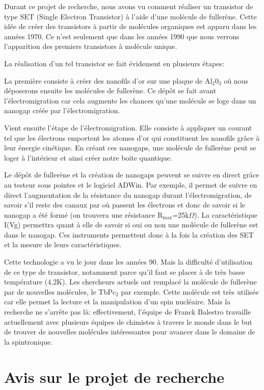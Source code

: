 Durant ce projet de recherche, nous avons vu comment réaliser un transistor de type SET (Single Electron Transistor) à l'aide d'une molécule de fullerène. Cette idée de créer des transistors à partir de molécules organiques est apparu dans les années 1970. Ce n'est seulement que dans les années 1990 que nous verrons l'apparition des premiers transistors à molécule unique. \medskip 

La réalisation d'un tel transistor se fait évidement en plusieurs étapes:

La première consiste à créer des nanofils d'or sur une plaque de Al$_2$0$_3$ où nous déposerons ensuite les molécules de fullerène. Ce dépôt se fait avant l'électromigration car cela augmente les chances qu'une molécule se loge dans un nanogap créée par l'électromigration.

Vient ensuite l'étape de l'électromigration. Elle consiste à appliquer un courant tel que les électrons emportent les atomes d'or qui constituent les nanofils grâce à leur énergie cinétique. En créant ces nanogaps, une molécule de fullerène peut se loger à l'intérieur et ainsi créer notre boite quantique. 

Le dépôt de fullerène et la création de nanogaps peuvent se suivre en direct grâce au testeur sous pointes et le logiciel ADWin. Par exemple, il permet de suivre en direct l'augmentation de la résistance du nanogap durant l'électromigration, de savoir s'il reste des canaux par où passent les électrons et donc de savoir si le nanogap a été formé (on trouvera une résistance R$_\text{max}$=25k$\Omega$). La caractéristique I(Vg) permettra quant à elle de savoir si oui ou non une molécule de fullerène est dans le nanogap. Ces instruments permettent donc à la fois la création des SET et la mesure de leurs caractéristiques.

Cette technologie a vu le jour dans les années 90. Mais la difficulté d'utilisation de ce type de transistor, notamment parce qu'il faut se placer à de très basse température (4,2K). Les chercheurs actuels ont remplacé la molécule de fullerène par de nouvelles molécules, le TbPc$_2$ par exemple. Cette molécule est très utilisée car elle permet la lecture et la manipulation d'un spin nucléaire. Mais la recherche ne s'arrête pas là: effectivement, l'équipe de Franck Balestro travaille actuellement avec plusieurs équipes de chimistes à travers le monde dans le but de trouver de nouvelles molécules intéressantes pour avancer dans le domaine de la spintronique.

\section*{Avis sur le projet de recherche}

